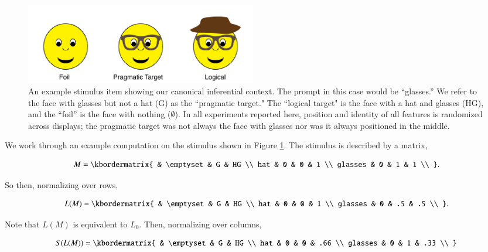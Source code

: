 \documentclass[man,noapacite]{apa2}
\begin{document}
\begin{figure}[t]
  \centering
  \includegraphics[width=4in]{figures/hatglasses.pdf}
  \caption{\label{fig:ex} An example stimulus item showing our canonical inferential context. The prompt in this case would be ``glasses.'' We refer to the face with glasses but not a hat ({\sc G}) as the ``pragmatic target." The  ``logical target"  is the face with a hat and glasses ({\sc HG}), and the ``foil'' is the face with nothing ($\emptyset$). In all experiments reported here, position and identity of all features is randomized across displays; the pragmatic target was not always the face with glasses nor was it always positioned in the middle.}
\end{figure}

We work through an example computation on the stimulus shown in Figure \ref{fig:ex}. The stimulus is described by a matrix,

\begin{equation}
  M = \kbordermatrix{
    & \emptyset & G & HG \\
    hat & 0 & 0 & 1  \\
    glasses & 0 & 1 & 1 \\
  }.
\end{equation}

\noindent So then, normalizing over rows,


\begin{equation}
  L(M) = \kbordermatrix{
    & \emptyset & G & HG \\
    hat & 0 & 0 & 1 \\
    glasses & 0 & .5 & .5 \\
  }.
\end{equation}

\noindent Note that $L(M)$ is equivalent to $L_0$. Then, normalizing over columns,

\begin{equation}
    S(L(M)) = \kbordermatrix{
      & \emptyset & G & HG \\
      hat & 0 & 0 & .66  \\
      glasses & 0 & 1 & .33 \\
    }
\end{equation}
\end{document}
